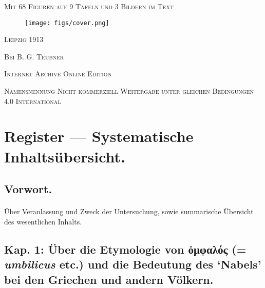 \documentclass[a4paper, 11pt, oneside]{article}
\begin{document}
\begin{titlepage}
        {\scshape\small Mit 68 Figuren auf 9 Tafeln und 3 Bildern im Text}

	\vspace{1\baselineskip}


        \vspace*{\fill}

        \begin{figure}[H]
        \centering
        \texttt{[image: figs/cover.png]}
        \end{figure}

	\vspace{1\baselineskip}

        \vspace*{\fill}

	{\small\scshape Leipzig 1913}
	
	{\small\scshape{Bei B. G. Teubner}}
 
	\vspace{0.5\baselineskip} %

        \scshape Internet Archive Online Edition  %
	
	{\scshape\small Namensnennung Nicht-kommerziell Weitergabe unter gleichen Bedingungen 4.0 International} %
\end{titlepage}
\setlength{\parskip}{1mm plus1mm minus1mm}
\clearpage
\Large
\tableofcontents
\clearpage
\section*{Register --- Systematische Inhaltsübersicht.}
\subsection*{Vorwort.}
\paragraph{}
Über Veranlassung und Zweck der Untersuchung, sowie summarische Übersicht des wesentlichen Inhalts.
\subsection*{Kap. 1: Über die Etymologie von ὀμφαλός (= \emph{umbilicus} etc.) und die Bedeutung des `Nabels' bei den Griechen und andern Völkern.}
\end{document}

